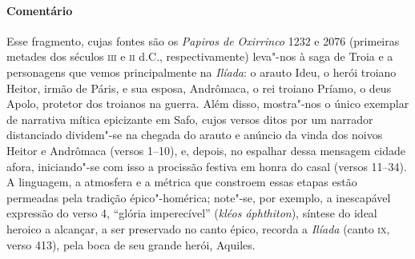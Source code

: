 {{\paragraph{Comentário} Esse fragmento, cujas fontes são os \textit{Papiros de Oxirrinco} 1232 e 2076
(primeiras metades dos séculos \textsc{iii} e \textsc{ii} d.C., respectivamente) leva"-nos à saga
de Troia e a personagens que vemos principalmente na \textit{Ilíada}: o arauto
Ideu, o herói troiano Heitor, irmão de Páris, e sua esposa, Andrômaca, o rei
troiano Príamo, o deus Apolo, protetor dos troianos na guerra. Além disso,
mostra"-nos o único exemplar de narrativa mítica epicizante
em Safo, cujos versos ditos por um narrador distanciado dividem"-se na
chegada do arauto e anúncio da vinda dos noivos Heitor e Andrômaca (versos
1--10), e, depois, no espalhar dessa mensagem cidade afora, iniciando"-se com
isso a procissão festiva em honra do casal (versos 11--34). A linguagem, a
atmosfera e a métrica que constroem essas etapas estão permeadas pela tradição
épico"-homérica; note"-se, por exemplo, a inescapável expressão do verso 4,
``glória imperecível” (\textit{kléos áphthiton}), síntese do ideal heroico a alcançar, a
ser preservado no canto épico, recorda a \textit{Ilíada }(canto \textsc{ix}, verso 413),
pela boca de seu grande herói, Aquiles.

}}
